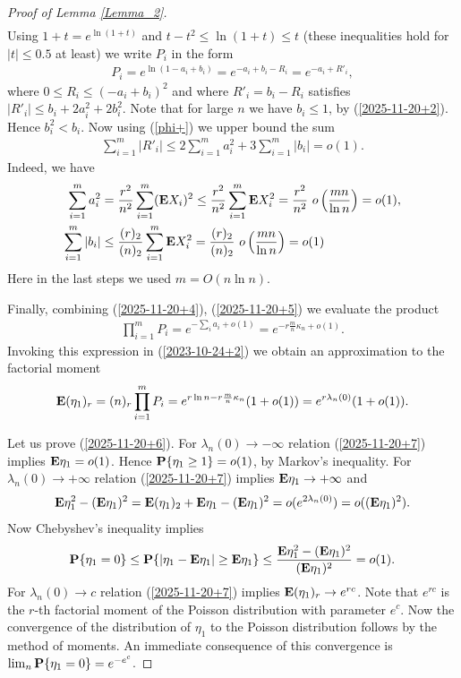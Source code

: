 \documentclass[11pt, a4paper]{article}
\newcommand{\E}{{\bf{E}}}
\newcommand{\PP}{{\bf{P}}}
\begin{document}
\begin{proof}[Proof of Lemma \ref{Lemma_2}]
\begin{align}
 \end{align}
Using $1+t=e^{\ln(1+t)}$ and $t-t^2\le \ln(1+t)\le t$ (these inequalities hold for $|t|\le 0.5$ at least)
we write $P_{i}$ in the form
\begin{align}
\label{2025-11-20+4}
P_{i}
=
e^{\ln(1-a_i+b_i)}
=
e^{-a_i+b_i-R_i}
=
e^{-a_i+R'_i},
\end{align}
where $0\le R_i\le (-a_i+b_i)^2$ and 
where
$R'_i=b_i-R_i$ satisfies
$|R'_i|\le b_i+2a_i^2+2b_i^2$.
Note that for large $n$ we have $b_i\le 1$, by  (\ref{2025-11-20+2}). Hence  
$b_i^2< b_i$. Now using (\ref{phi+})  we upper bound the sum
\begin{align}
\label{2025-11-20+5}
\sum_{i=1}^m
|R'_i|
\le 
2\sum_{i=1}^m a^2_i
+
3\sum_{i=1}^m |b_i|
=o(1).
\end{align}
Indeed,  we have
\begin{align*}
\sum_{i=1}^m a^2_i
&
=
\frac{r^2}{n^2}
\sum_{i=1}^m
(\E X_{i})^2
\le 
\frac{r^2}{n^2}
\sum_{i=1}^m
\E X^2_{i}
=\frac{r^2}{n^2}
\
o\left(\frac{mn}{\ln n}\right)
=
o(1),
\\
\sum_{i=1}^m |b_i|
&
\le 
\frac{(r)_2}{(n)_2}
\sum_{i=1}^m
\E X^2_{i}
=
\frac{(r)_2}{(n)_2}
\
o\left(\frac{mn}{\ln n}\right)
=o(1)
\end{align*}
Here in the last steps we used $m=O(n\ln n)$.

Finally, combining (\ref{2025-11-20+4}), (\ref{2025-11-20+5}) we evaluate the product
\begin{align*}
\prod_{i=1}^mP_{i}
=
e^{-\sum_ia_i+o(1)}
=
e^{-r\frac{m}{n}\kappa_n+o(1)}.
\end{align*}
Invoking this expression in (\ref{2023-10-24+2})
we obtain an approximation to the factorial moment
\begin{align}
\label{2025-11-20+7}
\E (\eta_1)_r
=
(n)_r \prod_{i=1}^mP_{i}
=
e^{r\ln n-r\frac{m}{n}\kappa_n}
(1+o(1))
=
e^{r\lambda_{n}(0)}
(1+o(1)).
\end{align}

Let us prove (\ref{2025-11-20+6}).
For $\lambda_{n}(0)\to-\infty$  
relation (\ref{2025-11-20+7}) implies
$\E \eta_1=o(1)$. Hence
$\PP\{\eta_1\ge 1\}=o(1)$, 
by Markov's inequality.
%
For $\lambda_{n}(0)\to+\infty$ relation (\ref{2025-11-20+7}) implies
$\E \eta_1\to+\infty$ and 
\begin{align*}
\E \eta^2_1-(\E \eta_1)^2
=
\E(\eta_1)_2+\E \eta_1-(\E \eta_1)^2
=
o(e^{2\lambda_{n}(0)})
=o((\E \eta_1)^2).
\end{align*}
Now Chebyshev's inequality implies
\begin{align*}
\PP\{\eta_1=0\}\le \PP\{|\eta_1-\E \eta_1|\ge \E \eta_1\}
\le
\frac{\E \eta_1^2-(\E \eta_1)^2}{(\E \eta_1)^2}
=
o(1).
\end{align*}
For $\lambda_{n}(0)\to c$ relation 
(\ref{2025-11-20+7}) implies $\E(\eta_1)_r\to e^{rc}$.
Note that $e^{rc}$ is the $r$-th factorial moment of the Poisson distribution with parameter $e^c$. Now the convergence of the distribution of $\eta_1$ to the Poisson distribution follows by the method of moments. An immediate consequence of this convergence is  $\lim_{n}\PP\{\eta_1=0\}=e^{-e^c}$. 
%
\end{proof}
\end{document}
